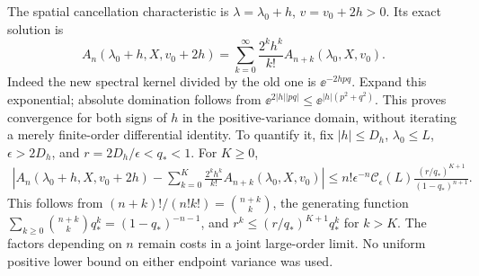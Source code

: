 The spatial cancellation characteristic is
\(\lambda=\lambda_0+h\), \(v=v_0+2h>0\). Its exact solution is
\begin{equation}\label{eq:gaussian-characteristic}
 A_n(\lambda_0+h,X,v_0+2h)
   =\sum_{k=0}^\infty\frac{2^kh^k}{k!}A_{n+k}(\lambda_0,X,v_0).
\end{equation}
Indeed the new spectral kernel divided by the old one is
\(\ee^{-2hpq}\). Expand this exponential; absolute domination follows
from \(\ee^{2|h||pq|}\le\ee^{|h|(p^2+q^2)}\).
This proves convergence for both signs of \(h\) in the positive-variance
domain, without iterating a merely finite-order differential identity.
To quantify it, fix \(|h|\le D_h\), \(\lambda_0\le L\),
\(\epsilon>2D_h\), and \(r=2D_h/\epsilon<q_*<1\). For \(K\ge0\),
\begin{align}\label{eq:gaussian-order-tail}
 \left|A_n(\lambda_0+h,X,v_0+2h)
       -\sum_{k=0}^K\frac{2^kh^k}{k!}A_{n+k}(\lambda_0,X,v_0)\right|
 \le n!\epsilon^{-n}\mathcal C_\epsilon(L)
       \frac{(r/q_*)^{K+1}}{(1-q_*)^{n+1}}.
\end{align}
This follows from
\((n+k)!/(n!k!)=\binom{n+k}{k}\), the generating function
\(\sum_{k\ge0}\binom{n+k}{k}q_*^k=(1-q_*)^{-n-1}\), and
\(r^k\le(r/q_*)^{K+1}q_*^k\) for \(k>K\).
The factors depending on \(n\) remain costs in a joint large-order limit.
No uniform positive lower bound on either endpoint variance was used.


